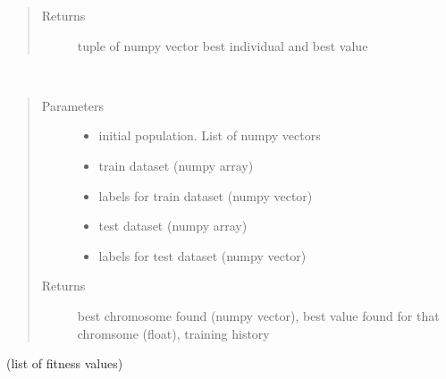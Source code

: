\documentclass[letterpaper,10pt,english]{sphinxmanual}
\begin{document}
\begin{fulllineitems}
\begin{fulllineitems}
\begin{quote}
\begin{description}
\item[{Returns}] \leavevmode
tuple of numpy vector best individual and best value

\end{description}\end{quote}

\end{fulllineitems}


\begin{fulllineitems}
\label{\detokenize{index:genetic_optimizer.GeneticRegularizator.fit}}~\begin{quote}\begin{description}
\item[{Parameters}] \leavevmode\begin{itemize}
\item {} 
 \textendash{} initial population. List of numpy vectors

\item {} 
 \textendash{} train dataset (numpy array)

\item {} 
 \textendash{} labels for train dataset (numpy vector)

\item {} 
 \textendash{} test dataset (numpy array)

\item {} 
 \textendash{} labels for test dataset (numpy vector)

\end{itemize}

\item[{Returns}] \leavevmode
best chromosome found (numpy vector), best value found for that chromsome (float), training history

\end{description}\end{quote}

(list of fitness values)


\end{fulllineitems}
\end{fulllineitems}
\end{document}
